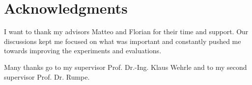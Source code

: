 \cleardoublepage

\chapter*{Acknowledgments}

I want to thank my advisors Matteo and Florian for their time and support.
Our discussions kept me focused on what was important and constantly pushed me towards improving the experiments and evaluations.

Many thanks go to my supervisor Prof. Dr.-Ing. Klaus Wehrle and to my second supervisor Prof. Dr. Rumpe.


